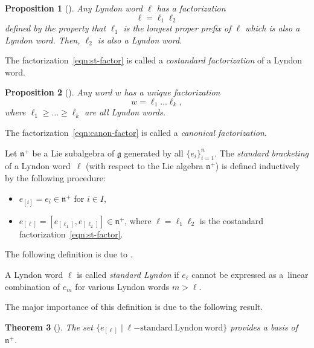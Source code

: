\documentclass[10pt,a4paper]{amsart}
\numberwithin{equation}{section}
\newtheorem{Theorem}{Theorem}[section]
\newtheorem{Proposition}[Theorem]{Proposition}
 { \theoremstyle{definition}
\newtheorem{Definition}[Theorem]{Definition}
\newtheorem{Note}[Theorem]{Note}
\newtheorem{Example}[Theorem]{Example}
\newtheorem{Remark}[Theorem]{Remark} }
\newcommand{\fg}{\mathfrak{g}}
\newcommand{\fn}{\mathfrak{n}}
\begin{document}
\begin{Proposition}[{\cite[Proposition~5.1.3]{Lo}}]%
Any Lyndon word $\ell$ has a factorization
\begin{equation}\label{eqn:st-factor}
 \ell = \ell_1 \ell_2
\end{equation}
defined by the property that $\ell_1$ is the longest proper prefix of $\ell$ which is also a Lyndon word.
Then, $\ell_2$ is also a Lyndon word.
\end{Proposition}

The factorization~\eqref{eqn:st-factor} is called a \textit{costandard factorization} of a Lyndon word.

\begin{Proposition}[{\cite[Proposition~5.1.5]{Lo}}]%
Any word $w$ has a unique factorization
\begin{equation}\label{eqn:canon-factor}
 w = \ell_1 \dots \ell_k,
\end{equation}
where $\ell_1 \geq \dots \geq \ell_k$ are all Lyndon words.
\end{Proposition}

The factorization~\eqref{eqn:canon-factor} is called a \textit{canonical factorization}.

Let $\fn^+$ be a Lie subalgebra of $\fg$ generated by all $\{e_i\}_{i=1}^n$. The \textit{standard bracketing} of a Lyndon word~$\ell$ (with respect to the Lie algebra $\fn^+$) is defined inductively by the following procedure:
\begin{itemize}\itemsep=0pt\samepage
\item[$\bullet$]
$e_{[i]}=e_i\in \fn^+$ for $i \in I$,

\item[$\bullet$]
$e_{[\ell]} = [e_{[\ell_1]}, e_{[\ell_2]}]\in \fn^+$, where $\ell=\ell_1\ell_2$ is
the costandard factorization~\eqref{eqn:st-factor}.

\end{itemize}
The following definition is due to \cite{LR}.

\begin{Definition}%
A Lyndon word $\ell$ is called \textit{standard Lyndon} if $e_{\ell}$ cannot be expressed as
a~linear combination of $e_m$ for various Lyndon words $m>\ell$.
\end{Definition}

The major importance of this definition is due to the following result.

\begin{Theorem}[{\cite{LR}}]%
The set $\bigl\{e_{[\ell]}\mid \ell\mathrm{-standard\ Lyndon\ word}\bigr\}$ provides a basis of $\fn^+$.
\end{Theorem}
\end{document}
